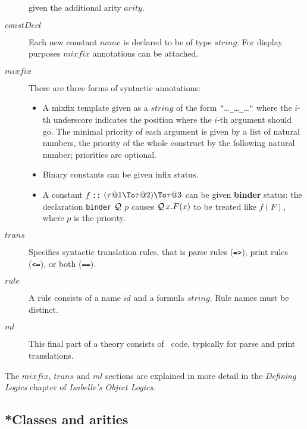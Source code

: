 \begin{description}
  given the additional arity $arity$.
\item[$constDecl$] Each new constant $name$ is declared to be of type
  $string$.  For display purposes $mixfix$ annotations can be attached.
\item[$mixfix$] There are three forms of syntactic annotations:
  \begin{itemize}
  \item A mixfix template given as a $string$ of the form
    {\tt"}\dots{\tt\_}\dots{\tt\_}\dots{\tt"} where the $i$-th underscore
    indicates the position where the $i$-th argument should go. The minimal
    priority of each argument is given by a list of natural numbers, the
    priority of the whole construct by the following natural number;
    priorities are optional.

  \item Binary constants can be given infix status.

  \item A constant $f$ {\tt::} $(\tau@1\To\tau@2)\To\tau@3$ can be given {\bf
    binder} status: the declaration {\tt binder} $\cal Q$ $p$ causes
  ${\cal Q}\,x.F(x)$ to be treated
  like $f(F)$, where $p$ is the priority.
  \end{itemize}
\item[$trans$] Specifies syntactic translation rules, that is parse 
  rules ({\tt =>}), print rules ({\tt <=}), or both ({\tt ==}).
\item[$rule$] A rule consists of a name $id$ and a formula $string$.  Rule
  names must be distinct.
\item[$ml$] This final part of a theory consists of \ML\ code, 
  typically for parse and print translations.
\end{description}
The $mixfix$, $trans$ and $ml$ sections are explained in more detail in 
the {\it Defining Logics} chapter of {\it Isabelle's Object Logics}.


\subsection{*Classes and arities}

